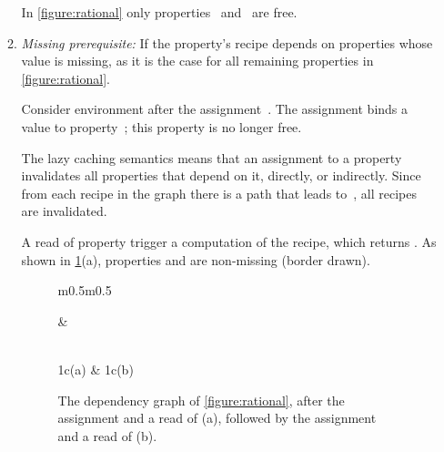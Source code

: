 \begin{enumerate}
\begin{enumerate}
          In \cref{figure:rational} only properties~ and~ are free.

    \item \emph{Missing prerequisite:} If the property's recipe depends on
          properties whose value is missing, as it is the case for all
          remaining properties in \cref{figure:rational}.

          Consider environment  after the assignment~.
          The assignment binds a value to property~; this property
          is no longer free.

          The lazy caching semantics means that an assignment to a property
          invalidates all properties that depend on it, directly, or indirectly.
          Since from each recipe in the graph there is a path that leads %
          to~, all recipes are invalidated.

          A read of property  trigger a computation of the
          recipe, which returns . As shown in \cref{figure:assignments}(a),
          properties  and  are non-missing (border drawn).

          \begin{figure}[H]
            \caption{\label{figure:assignments}%
              The dependency graph of \cref{figure:rational},
              after the assignment  and a read of  (a), 
              followed by the assignment  and a read of 
               (b).
            }
            \begin{tabular}{m{}m{}}
              \begin{minipage}[t]{0.5\columnwidth}
              \begin{adjustbox}{width=\columnwidth}
              
              \end{adjustbox}
              \end{minipage}
              & 
              \begin{minipage}[t]{0.5\columnwidth}
              \begin{adjustbox}{width=\columnwidth}
              
              \end{adjustbox}
              \end{minipage}
                \\ \multicolumn1c{(a)} & \multicolumn1c{(b)}
            \end{tabular}
          \end{figure}


\end{enumerate}
\end{enumerate}
